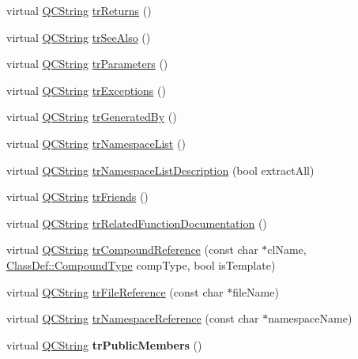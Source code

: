 \begin{DoxyCompactItemize}
\item 
virtual \hyperlink{class_q_c_string}{Q\-C\-String} \hyperlink{class_translator_ukrainian_ab5d8a97c3f20037cac764de958bd65e7}{tr\-Returns} ()
\item 
virtual \hyperlink{class_q_c_string}{Q\-C\-String} \hyperlink{class_translator_ukrainian_af0d165ede50aabbbdc9db316e370251f}{tr\-See\-Also} ()
\item 
virtual \hyperlink{class_q_c_string}{Q\-C\-String} \hyperlink{class_translator_ukrainian_a8955ee9ef9b45851d24617e2d5042038}{tr\-Parameters} ()
\item 
virtual \hyperlink{class_q_c_string}{Q\-C\-String} \hyperlink{class_translator_ukrainian_a97ca33ee6650968ebd891277ee0575dc}{tr\-Exceptions} ()
\item 
virtual \hyperlink{class_q_c_string}{Q\-C\-String} \hyperlink{class_translator_ukrainian_aa0426688896bb55b4980890f1cc6aa76}{tr\-Generated\-By} ()
\item 
virtual \hyperlink{class_q_c_string}{Q\-C\-String} \hyperlink{class_translator_ukrainian_ae958060c87ca1439cfe719469641a0b8}{tr\-Namespace\-List} ()
\item 
virtual \hyperlink{class_q_c_string}{Q\-C\-String} \hyperlink{class_translator_ukrainian_aeb5226ccdd672b54940c1705029367da}{tr\-Namespace\-List\-Description} (bool extract\-All)
\item 
virtual \hyperlink{class_q_c_string}{Q\-C\-String} \hyperlink{class_translator_ukrainian_a77493be94d937cfe7458c6317d792eb6}{tr\-Friends} ()
\item 
virtual \hyperlink{class_q_c_string}{Q\-C\-String} \hyperlink{class_translator_ukrainian_a5b5913d0d888aaca721ef5a67333bad1}{tr\-Related\-Function\-Documentation} ()
\item 
virtual \hyperlink{class_q_c_string}{Q\-C\-String} \hyperlink{class_translator_ukrainian_ae4c559d830de6436ef53c6ebcc3b1849}{tr\-Compound\-Reference} (const char $\ast$cl\-Name, \hyperlink{class_class_def_a768a6f0a6fd7e9087ff7971abbcc3f36}{Class\-Def\-::\-Compound\-Type} comp\-Type, bool is\-Template)
\item 
virtual \hyperlink{class_q_c_string}{Q\-C\-String} \hyperlink{class_translator_ukrainian_ab97b8df22dd810e2260a8cb9b06febbb}{tr\-File\-Reference} (const char $\ast$file\-Name)
\item 
virtual \hyperlink{class_q_c_string}{Q\-C\-String} \hyperlink{class_translator_ukrainian_a6014867d291ed13bd505e90304b3f7ba}{tr\-Namespace\-Reference} (const char $\ast$namespace\-Name)
\item 
\hypertarget{class_translator_ukrainian_aa766ee4ea863124dbd2c2cbfe8f615f6}{virtual \hyperlink{class_q_c_string}{Q\-C\-String} {\bfseries tr\-Public\-Members} ()}\label{class_translator_ukrainian_aa766ee4ea863124dbd2c2cbfe8f615f6}


\end{DoxyCompactItemize}
